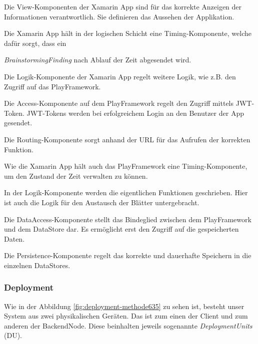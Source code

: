 \begin{description}[leftmargin=!,labelwidth=\widthof{\bfseries DataAccessComponent}]
	
	\item[ViewComponent] Die View-Komponenten der Xamarin App sind für das korrekte Anzeigen der Informationen verantwortlich. Sie definieren das Aussehen der Applikation.
	
	\item[AppTimingComponent] Die Xamarin App hält in der logischen Schicht eine Timing-Komponente, welche dafür sorgt, dass ein 
	
	\textit{BrainstormingFinding} nach Ablauf der Zeit abgesendet wird.
	
	\item[AppLogicComponent] Die Logik-Komponente der Xamarin App regelt weitere Logik, wie z.B. den Zugriff auf das PlayFramework.
	
	\item[AccessComponent] Die Access-Komponente auf dem PlayFramework regelt den Zugriff mittels JWT-Token. JWT-Tokens werden bei erfolgreichem Login an den Benutzer der App gesendet. 
	
	\item[Routing] Die Routing-Komponente sorgt anhand der URL für das Aufrufen der korrekten Funktion.
	
	\item[TimingComponent] Wie die Xamarin App hält auch das PlayFramework eine Timing-Komponente, um den Zustand der Zeit verwalten zu können.
	
	\item[LogicComponent] In der Logik-Komponente werden die eigentlichen Funktionen geschrieben. Hier ist auch die Logik für den Austausch der Blätter untergebracht.
	
	\item[DataAccessComponent] Die DataAccess-Komponente stellt das Bindeglied zwischen dem PlayFramework und dem DataStore dar. Es ermöglicht erst den Zugriff auf die gespeicherten Daten.
	
	\item[PersistenceComponent] Die Persistence-Komponente regelt das korrekte und dauerhafte Speichern in die einzelnen DataStores.
\end{description}

\subsubsection{Deployment}
Wie in der Abbildung \ref{fig:deployment-methode635} zu sehen ist, besteht unser System aus zwei physikalischen Geräten. Das ist zum einen der Client und zum anderen der BackendNode. Diese beinhalten jeweils sogenannte \textit{DeploymentUnits} (DU). 

